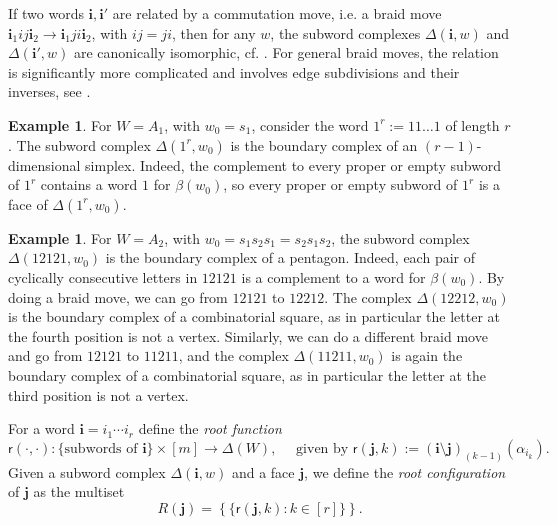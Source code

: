 \documentclass[a4paper, 11pt]{amsart}
\newcommand{\rootf}{\mathsf{r}}
\newcommand{\word}[1]{\mathbf{#1}}
\theoremstyle{definition}
\newtheorem{example}[theorem]{Example}
\begin{document}
If two words $\word{i}, \word{i'}$ are related by a commutation move, i.e. a braid move $\word{i}_1 ij \word{i}_2 \to \word{i}_1 ji \word{i}_2$, with $ij = ji$, then for any $w$, the subword complexes $\Delta(\word{i},w)$ and $\Delta(\word{i'},w)$ are canonically isomorphic, cf. \cite[Proposition 3.8]{cls}. For general braid moves, the relation is significantly more complicated and involves edge subdivisions and their inverses, see \cite{G_subword_3, manneville}. 

\begin{example}
\label{ex:A_1_simplex}
For $W = A_1$, with $w_0 = s_1$, consider the word $1^r := 11\ldots 1$ of length $r$. The subword complex $\Delta(1^r, w_0)$ is the boundary complex of an $(r-1)$-dimensional simplex. Indeed, the complement to every proper or empty subword of $1^r$ contains a word $1$ for $\beta(w_0)$, so every proper or empty subword of $1^r$ is a face of $\Delta(1^r, w_0)$.
\end{example}

\begin{example}
For $W = A_2$, with $w_0 = s_1s_2s_1 = s_2s_1s_2$, the subword complex $\Delta(12121, w_0)$ is the boundary complex of a pentagon. Indeed, each pair of cyclically consecutive letters in $12121$ is a complement to a word for $\beta(w_0)$. By doing a braid move, we can go from $12121$ to $12212$. The complex $\Delta(12212, w_0)$ is the boundary complex of a combinatorial square, as in particular the letter at the fourth position is not a vertex. Similarly, we can do a different braid move and go from $12121$ to $11211$, and the complex $\Delta(11211, w_0)$ is again the boundary complex of a combinatorial square, as in particular the letter at the third position is not a vertex.
\end{example}

For a word $\word{i}=i_1\cdots i_r$ define the \emph{root function} 
\begin{equation}\label{eq:root fct}
    \rootf(\cdot,\cdot):\{\text{subwords of }\word{i}\} \times [m] \to \Delta(W), \quad \text{ given by } \rootf(\word{j},k):=(\word{i}\setminus \word{j})_{(k-1)}(\alpha_{i_k}).
\end{equation}
Given a subword complex $\Delta(\word{i},w)$ and a face $\word{j}$, we define the \emph{root configuration} of $\word{j}$ as the multiset 
\begin{equation}\label{eq:root config}
    R(\word{j})=\left\{\{\rootf(\word{j},k):k\in[r]\}\right\}.
\end{equation}
\end{document}
